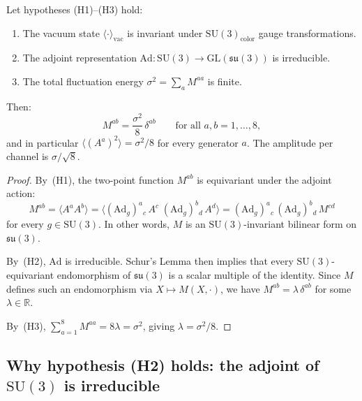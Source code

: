 \begin{theorem}
  \label{thm:equipartition}
  Let hypotheses \textup{(H1)--(H3)} hold:
  \begin{enumerate}[label=\textup{(H\arabic*)}]
    \item The vacuum state $\langle\cdot\rangle_{\mathrm{vac}}$ is invariant
          under $\mathrm{SU}(3)_{\mathrm{color}}$ gauge transformations.
    \item The adjoint representation
          $\mathrm{Ad}\colon\mathrm{SU}(3)\to\mathrm{GL}(\mathfrak{su}(3))$
          is irreducible.
    \item The total fluctuation energy $\sigma^2 = \sum_a M^{aa}$ is finite.
  \end{enumerate}
  Then:
  \begin{equation}
    M^{ab} = \frac{\sigma^2}{8}\,\delta^{ab}
    \qquad\text{for all }a,b=1,\ldots,8,
  \end{equation}
  and in particular $\langle(A^a)^2\rangle = \sigma^2/8$ for every
  generator $a$.  The amplitude per channel is $\sigma/\sqrt{8}$.
\end{theorem}

\begin{proof}
By~(H1), the two-point function $M^{ab}$ is equivariant under the adjoint action:
\[
  M^{ab} = \bigl\langle A^a A^b\bigr\rangle
    = \bigl\langle (\mathrm{Ad}_g)^{a}{}_{c}\,A^c\;
                  (\mathrm{Ad}_g)^{b}{}_{d}\,A^d\bigr\rangle
    = (\mathrm{Ad}_g)^{a}{}_{c}\,(\mathrm{Ad}_g)^{b}{}_{d}\,M^{cd}
\]
for every $g\in\mathrm{SU}(3)$.  In other words, $M$ is an
$\mathrm{SU}(3)$-invariant bilinear form on $\mathfrak{su}(3)$.

By~(H2), $\mathrm{Ad}$ is irreducible.  Schur's Lemma then implies that every
$\mathrm{SU}(3)$-equivariant endomorphism of $\mathfrak{su}(3)$ is a scalar
multiple of the identity.  Since $M$ defines such an endomorphism via
$X\mapsto M(X,\cdot)$, we have $M^{ab}=\lambda\,\delta^{ab}$ for some
$\lambda\in\mathbb{R}$.

By~(H3), $\sum_{a=1}^8 M^{aa} = 8\lambda = \sigma^2$, giving
$\lambda=\sigma^2/8$.
\end{proof}

\subsection{Why hypothesis (H2) holds: the adjoint of $\mathrm{SU}(3)$
  is irreducible}

